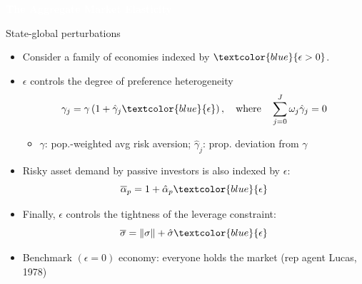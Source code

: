 \begin{transitionframe}
	\begin{center}
		\huge \textcolor{white}{\textbf{The Aggregate Market Elasticity}}
	\end{center}
\end{transitionframe}


\begin{frame}{State-global perturbations}
    \begin{itemize}
        \item Consider a family of economies indexed by $\textcolor{blue}{\epsilon>0}$.
        \item $\epsilon$ controls the degree of preference heterogeneity
        \[\gamma_{j}=\gamma\left(1+\hat{\gamma}_{j} \textcolor{blue}{\epsilon}\right), \quad\text{where}\quad \sum_{j=0}^{J} \omega_{j} \hat{\gamma}_{j}=0\]
        \vspace{-2mm}
        \begin{itemize}
            \item $\gamma$: pop.-weighted avg risk aversion; $\hat{\gamma}_j$: prop. deviation from $\gamma$
        \end{itemize}
        \item Risky asset demand by passive investors is also indexed by $\epsilon$:
        \[\overline{\alpha}_p = 1 + \hat{\alpha}_p \textcolor{blue}{\epsilon}\]
        \item Finally, $\epsilon$ controls the tightness of the leverage constraint:
        \[\overline{\sigma}=\|\sigma\|+\hat{\sigma}\textcolor{blue}{\epsilon}\]
    \item Benchmark $ (\epsilon=0) $ economy: everyone holds the market {\scriptsize(rep agent Lucas, 1978)}
    \end{itemize}
\end{frame}

